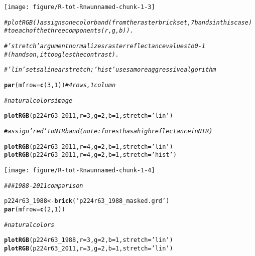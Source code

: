 \documentclass{article}\usepackage[]{graphicx}\usepackage[]{color}
\makeatletter
\newcommand{\hlnum}[1]{\textcolor[rgb]{0.686,0.059,0.569}{#1}}%
\newcommand{\hlstr}[1]{\textcolor[rgb]{0.192,0.494,0.8}{#1}}%
\newcommand{\hlcom}[1]{\textcolor[rgb]{0.678,0.584,0.686}{\textit{#1}}}%
\newcommand{\hlstd}[1]{\textcolor[rgb]{0.345,0.345,0.345}{#1}}%
\newcommand{\hlkwb}[1]{\textcolor[rgb]{0.69,0.353,0.396}{#1}}%
\newcommand{\hlkwc}[1]{\textcolor[rgb]{0.333,0.667,0.333}{#1}}%
\newcommand{\hlkwd}[1]{\textcolor[rgb]{0.737,0.353,0.396}{\textbf{#1}}}%
\newenvironment{kframe}{%
 \def\at@end@of@kframe{}%
 \ifinner\ifhmode%
  \def\at@end@of@kframe{\end{minipage}}%
  \begin{minipage}{\columnwidth}%
 \fi\fi%
 \def\FrameCommand##1{\hskip\@totalleftmargin \hskip-\fboxsep
 \colorbox{shadecolor}{##1}\hskip-\fboxsep
     \hskip-\linewidth \hskip-\@totalleftmargin \hskip\columnwidth}%
 \MakeFramed {\advance\hsize-\width
   \@totalleftmargin\z@ \linewidth\hsize
   \@setminipage}}%
 {\par\unskip\endMakeFramed%
 \at@end@of@kframe}
\newenvironment{knitrout}{}{} %
\makeatother
\begin{document}
\begin{knitrout}
{\centering \texttt{[image: figure/R-tot-Rnwunnamed-chunk-1-3]} 

}


\begin{kframe}\begin{alltt}
\hlcom{# plotRGB() assigns one color band (from the raster brick set, 7 bands in this case)}
\hlcom{# to each of the three components (r, g, b)).}

\hlcom{# 'stretch' argument  normalizes raster reflectance values to 0-1}
\hlcom{# (hands on, it toogles the contrast).}

\hlcom{# 'lin' sets a linear stretch; 'hist' uses a more aggressive algorithm}

\hlkwd{par}\hlstd{(}\hlkwc{mfrow} \hlstd{=} \hlkwd{c}\hlstd{(}\hlnum{3}\hlstd{,} \hlnum{1}\hlstd{))} \hlcom{# 4 rows, 1 column}

\hlcom{# natural colors image}

\hlkwd{plotRGB}\hlstd{(p224r63_2011,} \hlkwc{r} \hlstd{=} \hlnum{3}\hlstd{,} \hlkwc{g} \hlstd{=} \hlnum{2}\hlstd{,} \hlkwc{b} \hlstd{=} \hlnum{1}\hlstd{,} \hlkwc{stretch} \hlstd{=} \hlstr{'lin'}\hlstd{)}

\hlcom{# assign 'red' to NIR band (note: forest has a high reflectance in NIR)}

\hlkwd{plotRGB}\hlstd{(p224r63_2011,} \hlkwc{r} \hlstd{=} \hlnum{4}\hlstd{,} \hlkwc{g} \hlstd{=} \hlnum{2}\hlstd{,} \hlkwc{b} \hlstd{=} \hlnum{1}\hlstd{,} \hlkwc{stretch} \hlstd{=} \hlstr{'lin'}\hlstd{)}
\hlkwd{plotRGB}\hlstd{(p224r63_2011,} \hlkwc{r} \hlstd{=} \hlnum{4}\hlstd{,} \hlkwc{g} \hlstd{=} \hlnum{2}\hlstd{,} \hlkwc{b} \hlstd{=} \hlnum{1}\hlstd{,} \hlkwc{stretch} \hlstd{=} \hlstr{'hist'}\hlstd{)}
\end{alltt}
\end{kframe}

{\centering \texttt{[image: figure/R-tot-Rnwunnamed-chunk-1-4]} 

}


\begin{kframe}\begin{alltt}
\hlcom{### 1988 - 2011 comparison}

\hlstd{p224r63_1988} \hlkwb{<-} \hlkwd{brick}\hlstd{(}\hlstr{'p224r63_1988_masked.grd'}\hlstd{)}
\hlkwd{par}\hlstd{(}\hlkwc{mfrow} \hlstd{=} \hlkwd{c}\hlstd{(}\hlnum{2}\hlstd{,} \hlnum{1}\hlstd{))}

\hlcom{# natural colors}

\hlkwd{plotRGB}\hlstd{(p224r63_1988,} \hlkwc{r} \hlstd{=} \hlnum{3}\hlstd{,} \hlkwc{g} \hlstd{=} \hlnum{2}\hlstd{,} \hlkwc{b} \hlstd{=} \hlnum{1}\hlstd{,} \hlkwc{stretch} \hlstd{=} \hlstr{'lin'}\hlstd{)}
\hlkwd{plotRGB}\hlstd{(p224r63_2011,} \hlkwc{r} \hlstd{=} \hlnum{3}\hlstd{,} \hlkwc{g} \hlstd{=} \hlnum{2}\hlstd{,} \hlkwc{b} \hlstd{=} \hlnum{1}\hlstd{,} \hlkwc{stretch} \hlstd{=} \hlstr{'lin'}\hlstd{)}
\end{alltt}
\end{kframe}


\end{knitrout}
\end{document}
